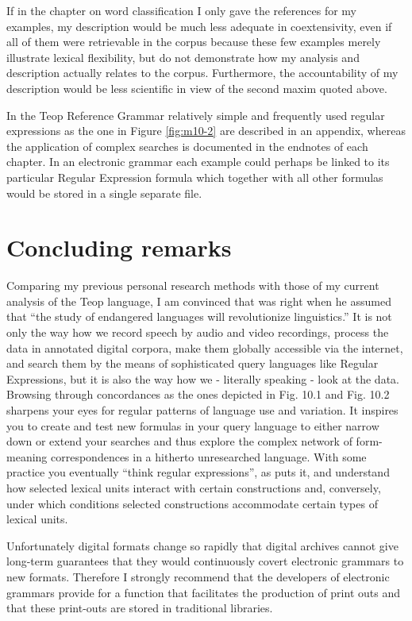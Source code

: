 If in the chapter on word classification I only gave the references for my examples, my description would be much less adequate in coextensivity, even if all of them were retrievable in the corpus because these few examples merely illustrate lexical flexibility, but do not demonstrate how my analysis and description actually relates to the corpus. Furthermore, the accountability of my description would be less scientific in view of the second maxim quoted above.


In the Teop Reference Grammar \citep{Moselinpreparation}   relatively simple and frequently used regular expressions as the one in Figure \ref{fig:m10-2} are described in an appendix, whereas the application of complex searches is documented in the endnotes of each chapter. In an electronic grammar each example could perhaps be linked to its particular Regular Expression formula which together with all other formulas would be stored in a single separate file. 

\section{Concluding remarks}%


Comparing my previous personal research methods with those of my current analysis of the Teop language, I am convinced that \citet{Whalen2004} was right when he assumed that ``the study of endangered languages will revolutionize linguistics.'' It is not only the way how we record speech by audio and video recordings, process the data in annotated digital corpora, make them globally accessible via the internet, and search them by the means of sophisticated query languages like Regular Expressions, but it is also the way how we - literally speaking - look at the data. Browsing through concordances as the ones depicted in Fig. 10.1 and Fig. 10.2 sharpens your eyes for regular patterns of language use and variation. It inspires you to create and test new formulas in your query language to either narrow down or extend your searches and thus explore the complex network of form-meaning correspondences in a hitherto unresearched language. With some practice you eventually ``think regular expressions'', as \citet[6]{Friedl2006} puts it, and understand how selected lexical units interact with certain constructions and, conversely, under which conditions selected constructions accommodate certain types of lexical units.


Unfortunately digital formats change so rapidly that digital archives cannot give long-term guarantees that they would continuously covert electronic grammars to new formats. Therefore I strongly recommend that the developers of electronic grammars provide for a function that facilitates the production of print outs and that these print-outs are stored in traditional libraries.

